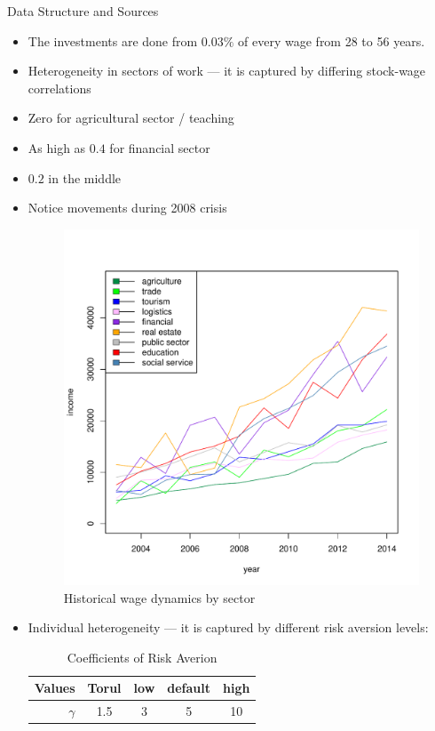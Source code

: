 \documentclass{beamer}
\begin{document}
\begin{frame}[allowframebreaks]{Data Structure and Sources}
\begin{itemize}
	\framebreak

	\item The investments are done from $0.03\%$ of every wage from 28 to 56 years.
	\item Heterogeneity in sectors of work --- it is captured by differing stock-wage correlations
	\item Zero for agricultural sector / teaching
	\item As high as $0.4$ for financial sector
	\item $0.2$ in the middle
	\item Notice movements during 2008 crisis

\begin{figure}[h]
	\centering
	\includegraphics[scale=0.3]{figs/wage2sec.pdf}
	\caption{Historical wage dynamics by sector}
\end{figure}

\framebreak

	\item Individual heterogeneity --- it is captured by different risk aversion levels:

\begin{table}
	\centering
	\caption{Coefficients of Risk Averion}
	\begin{tabular}[c]{r|cccc}
		Values&Torul&low&default&high\\
		\hline
		$\gamma$&1.5&3&5&10\\
	\end{tabular}
\end{table}
	

\end{itemize}
\end{frame}
\end{document}
